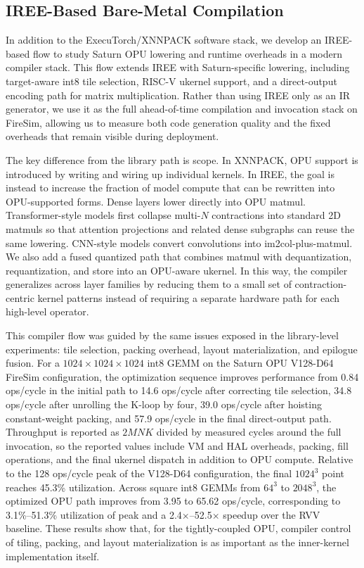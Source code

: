 \subsection{IREE-Based Bare-Metal Compilation}\label{sec:iree-compilation}

In addition to the ExecuTorch/XNNPACK software stack, we develop an IREE-based flow to study Saturn OPU lowering and runtime overheads in a modern compiler stack. This flow extends IREE with Saturn-specific lowering, including target-aware int8 tile selection, RISC-V ukernel support, and a direct-output encoding path for matrix multiplication. Rather than using IREE only as an IR generator, we use it as the full ahead-of-time compilation and invocation stack on FireSim, allowing us to measure both code generation quality and the fixed overheads that remain visible during deployment.

The key difference from the library path is scope. In XNNPACK, OPU support is introduced by writing and wiring up individual kernels. In IREE, the goal is instead to increase the fraction of model compute that can be rewritten into OPU-supported forms. Dense layers lower directly into OPU matmul. Transformer-style models first collapse multi-\(N\) contractions into standard 2D matmuls so that attention projections and related dense subgraphs can reuse the same lowering. CNN-style models convert convolutions into im2col-plus-matmul. We also add a fused quantized path that combines matmul with dequantization, requantization, and store into an OPU-aware ukernel. In this way, the compiler generalizes across layer families by reducing them to a small set of contraction-centric kernel patterns instead of requiring a separate hardware path for each high-level operator.

This compiler flow was guided by the same issues exposed in the library-level experiments: tile selection, packing overhead, layout materialization, and epilogue fusion. For a \(1024\times 1024\times 1024\) int8 GEMM on the Saturn OPU V128-D64 FireSim configuration, the optimization sequence improves performance from 0.84 ops/cycle in the initial path to 14.6 ops/cycle after correcting tile selection, 34.8 ops/cycle after unrolling the K-loop by four, 39.0 ops/cycle after hoisting constant-weight packing, and 57.9 ops/cycle in the final direct-output path. Throughput is reported as \(2MNK\) divided by measured cycles around the full invocation, so the reported values include VM and HAL overheads, packing, fill operations, and the final ukernel dispatch in addition to OPU compute. Relative to the 128 ops/cycle peak of the V128-D64 configuration, the final \(1024^3\) point reaches 45.3\% utilization. Across square int8 GEMMs from \(64^3\) to \(2048^3\), the optimized OPU path improves from 3.95 to 65.62 ops/cycle, corresponding to 3.1\%--51.3\% utilization of peak and a 2.4\(\times\)--52.5\(\times\) speedup over the RVV baseline. These results show that, for the tightly-coupled OPU, compiler control of tiling, packing, and layout materialization is as important as the inner-kernel implementation itself.

